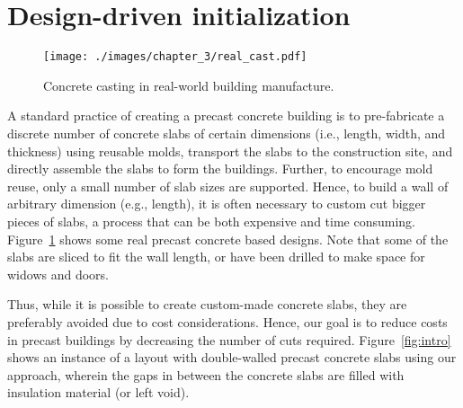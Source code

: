 \begin{figure*}[t!]
\centering
{}
\caption[Interactive floor plan generation.]{Interactive floor plan generation by our system based on constrained optimization and precast concrete based construction cost minimization. Concrete slabs that were cut are highlighted in red. }
\label{fig:intro}
\end{figure*}

\section{Design-driven initialization}

\begin{figure}[b!]
\centering
\texttt{[image: ./images/chapter\_3/real\_cast.pdf]}
\caption{Concrete casting in real-world building manufacture.}
\label{fig:realCast}
\end{figure}

A standard practice of creating a precast concrete building is to pre-fabricate a discrete number of concrete slabs of certain dimensions (i.e., length, width, and thickness) using reusable molds, transport the slabs to the construction site, and directly assemble the slabs to form the buildings. Further, to encourage mold reuse, only a small number of slab sizes are supported. Hence, to build a wall of arbitrary dimension (e.g., length), it is often necessary to custom cut bigger pieces of slabs, a process that can be both expensive and time consuming.
%
Figure~\ref{fig:realCast} shows some real precast concrete based designs. Note that some of the slabs are sliced to fit the wall length, or have been drilled to make space for widows and doors.

Thus, while it is possible to create custom-made concrete slabs, they are preferably avoided due to cost considerations. Hence, our goal is to reduce costs in precast buildings by decreasing the number of cuts required. Figure~\ref{fig:intro} shows an instance of a layout with double-walled precast concrete slabs using our approach, wherein the gaps in between the concrete slabs are filled with insulation material (or left void).

